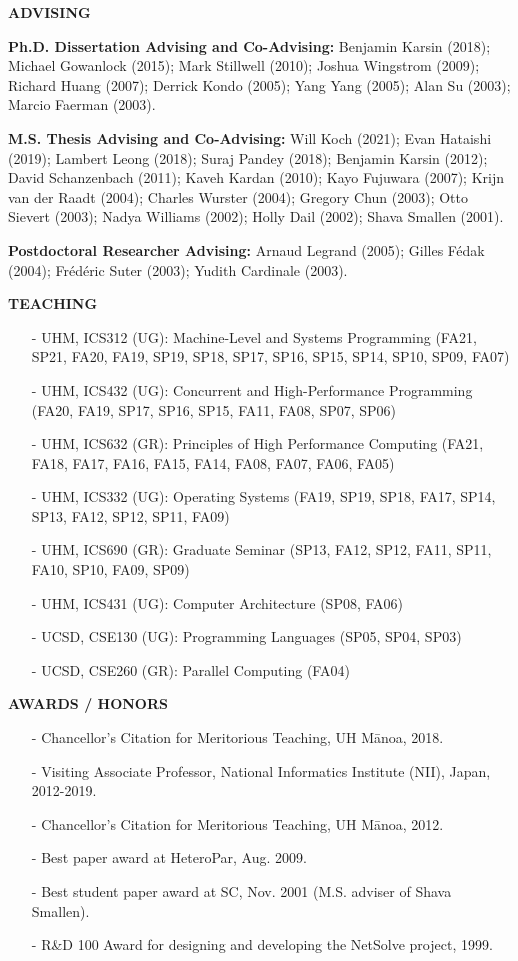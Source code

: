 \documentclass[times,11pt]{letter}
\begin{document}
\noindent
{\large{\bf ADVISING}}


\noindent
{\bf Ph.D. Dissertation Advising and Co-Advising:}
 Benjamin Karsin (2018); 
 Michael Gowanlock (2015);
 Mark Stillwell (2010); 
 Joshua Wingstrom (2009);
 Richard Huang (2007); 
 Derrick Kondo (2005);
 Yang Yang (2005);
 Alan Su (2003);
 Marcio Faerman (2003).

\noindent
{\bf M.S. Thesis Advising and Co-Advising:}
 Will Koch (2021);
 Evan Hataishi (2019);
 Lambert Leong (2018);
 Suraj Pandey (2018);
 Benjamin Karsin (2012);
 David Schanzenbach (2011);
 Kaveh Kardan (2010);
 Kayo Fujuwara (2007);
 Krijn van der Raadt (2004);
 Charles Wurster (2004);
 Gregory Chun (2003);
 Otto Sievert (2003);
 Nadya Williams (2002);
 Holly Dail (2002);
 Shava Smallen (2001).

\noindent
{\bf Postdoctoral Researcher Advising:}
 Arnaud Legrand (2005);
 Gilles F\'edak (2004);
 Fr\'ed\'eric Suter (2003);
 Yudith Cardinale (2003).


\noindent
{\large{\bf TEACHING}}


\begin{itemize}
\item [-] UHM, ICS312 (UG): Machine-Level and Systems Programming (FA21, SP21, FA20, FA19, SP19, SP18, SP17, SP16, SP15, SP14, SP10, SP09, FA07)
\item [-] UHM, ICS432 (UG): Concurrent and High-Performance Programming (FA20, FA19,  SP17, SP16, SP15, FA11, FA08, SP07, SP06)
\item [-] UHM, ICS632 (GR): Principles of High Performance Computing (FA21, FA18, FA17, FA16, FA15, FA14, FA08, FA07, FA06, FA05)
\item [-] UHM, ICS332 (UG): Operating Systems (FA19, SP19, SP18, FA17, SP14, SP13, FA12, SP12, SP11, FA09)
\item [-] UHM, ICS690 (GR): Graduate Seminar (SP13, FA12, SP12, FA11, SP11, FA10, SP10, FA09, SP09)
\item [-] UHM, ICS431 (UG): Computer Architecture (SP08, FA06)
\item [-] UCSD, CSE130 (UG): Programming Languages (SP05, SP04, SP03)
\item [-] UCSD, CSE260 (GR): Parallel Computing (FA04)
\end{itemize}

\noindent
{\large{\bf AWARDS / HONORS}}
\begin{itemize}
\item[-] Chancellor's Citation for Meritorious Teaching, UH M\=anoa, 2018.
\item[-] Visiting Associate Professor, National Informatics Institute (NII), Japan, 2012-2019.
\item[-] Chancellor's Citation for Meritorious Teaching, UH M\=anoa, 2012.
\item[-] Best paper award at HeteroPar, Aug. 2009.
\item[-] Best student paper award at SC, Nov. 2001 (M.S. adviser of Shava Smallen).
\item[-] R\&D 100 Award for designing and developing the NetSolve project, 1999.
\end{itemize}
\end{document}
